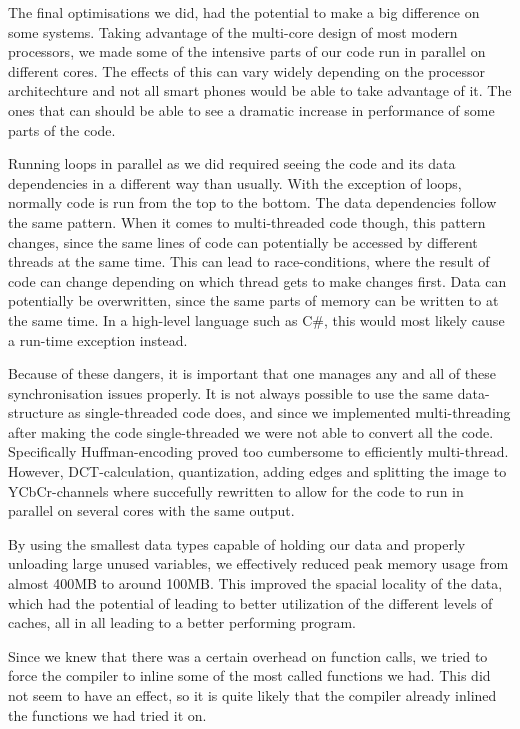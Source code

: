 The final optimisations we did, had the potential to make a big difference on some systems.
Taking advantage of the multi-core design of most modern processors, we made some of the intensive parts of our code run in parallel on different cores.
The effects of this can vary widely depending on the processor architechture and not all smart phones would be able to take advantage of it.
The ones that can should be able to see a dramatic increase in performance of some parts of the code.

Running loops in parallel as we did required seeing the code and its data dependencies in a different way than usually.
With the exception of loops, normally code is run from the top to the bottom.
The data dependencies follow the same pattern.
When it comes to multi-threaded code though, this pattern changes, since the same lines of code can potentially be accessed by different threads at the same time.
This can lead to race-conditions, where the result of code can change depending on which thread gets to make changes first.
Data can potentially be overwritten, since the same parts of memory can be written to at the same time.
In a high-level language such as C\#, this would most likely cause a run-time exception instead.

Because of these dangers, it is important that one manages any and all of these synchronisation issues properly.
It is not always possible to use the same data-structure as single-threaded code does, and since we implemented multi-threading after making the code single-threaded we were not able to convert all the code.
Specifically Huffman-encoding proved too cumbersome to efficiently multi-thread.
However, DCT-calculation, quantization, adding edges and splitting the image to YCbCr-channels where succefully rewritten to allow for the code to run in parallel on several cores with the same output.

By using the smallest data types capable of holding our data and properly unloading large unused variables, we effectively reduced peak memory usage from almost 400MB to around 100MB.
This improved the spacial locality of the data, which had the potential of leading to better utilization of the different levels of caches, all in all leading to a better performing program.

Since we knew that there was a certain overhead on function calls, we tried to force the compiler to inline some of the most called functions we had. 
This did not seem to have an effect, so it is quite likely that the compiler already inlined the functions we had tried it on.

